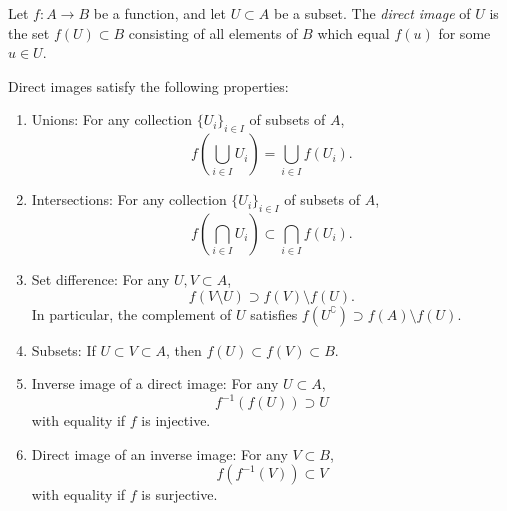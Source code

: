 \documentclass[12pt]{article}
\begin{document}
Let $f\colon A \longrightarrow B$ be a function, and let $U \subset A$ be a subset. The {\em direct image} of $U$ is the set $f(U) \subset B$ consisting of all elements of $B$ which equal $f(u)$ for some $u \in U$.

Direct images satisfy the following properties:

\begin{enumerate}
\item Unions: For any collection $\{U_i\}_{i \in I}$ of subsets of $A$,
$$
f\left(\bigcup_{i \in I} U_i\right) = \bigcup_{i\in I} f(U_i).
$$
\item Intersections: For any collection $\{U_i\}_{i \in I}$ of subsets of $A$,
$$
f\left(\bigcap_{i \in I} U_i\right) \subset \bigcap_{i\in I} f(U_i).
$$
\item Set difference: For any $U,V \subset A$,
$$
f(V \setminus U) \supset f(V) \setminus f(U).
$$
In particular, the complement of $U$ satisfies $f(U^\complement) \supset f(A) \setminus f(U)$.
\item Subsets: If $U \subset V \subset A$, then $f(U) \subset f(V) \subset B$.
\item Inverse image of a direct image: For any $U \subset A$,
$$f^{-1}(f(U)) \supset U$$
with equality if $f$ is injective.
\item Direct image of an inverse image: For any $V \subset B$,
$$f(f^{-1}(V)) \subset V$$
with equality if $f$ is surjective.
\end{enumerate}
\end{document}
